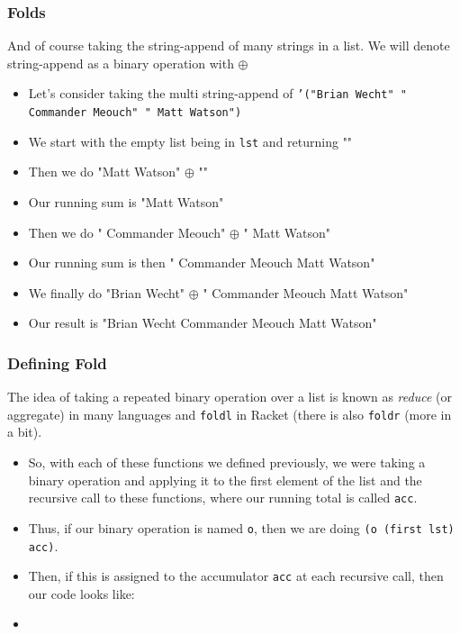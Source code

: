 \documentclass{beamer}
\begin{document}
\begin{frame}
  \frametitle{Folds}
  And of course taking the string-append of many strings in a list. We will
  denote string-append as a binary operation with $\oplus$
  \begin{itemize}
  \item<2-> Let's consider taking the multi string-append of \texttt{'("Brian Wecht" " Commander Meouch" " Matt Watson")}
  \item<3-> We start with the empty list being in  \texttt{lst} and
    returning ""
  \item<4-> Then we do "Matt Watson" $\oplus$ ""
  \item<5-> Our running sum is "Matt Watson"
  \item<6-> Then we do " Commander Meouch" $\oplus$ " Matt Watson"
  \item<7-> Our running sum is then " Commander Meouch Matt Watson"
  \item<8-> We finally do "Brian Wecht" $\oplus$ " Commander Meouch Matt Watson"
  \item<9-> Our result is "Brian Wecht Commander Meouch Matt Watson"
  \end{itemize}
\end{frame}


\begin{frame}
  \frametitle{Defining Fold}
  The idea of taking a repeated binary operation over a list is known as
  \emph{reduce} (or aggregate) in many languages and \texttt{foldl} in Racket (there
  is also \texttt{foldr} (more in a bit).
  \begin{itemize}
  \item<2-> So, with each of these functions we defined previously, we were
    taking a binary operation
    and applying it to the first element of the list and the recursive call to
    these functions, where our running total is called \texttt{acc}.
  \item<3-> Thus, if our binary operation is named \texttt{o}, then
    we are doing \texttt{(o (first lst) acc)}.
  \item<4-> Then, if this is assigned to the accumulator \texttt{acc}
    at each recursive call, then our code looks like:
  \item<5-> \foldRec
    
  \end{itemize}
\end{frame}
\end{document}
